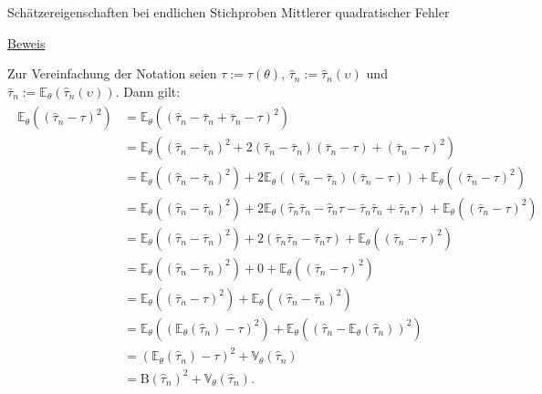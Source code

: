 \documentclass[
  8pt,
  ignorenonframetext,
]{beamer}
\newcommand{\ups} {\upsilon}
\begin{document}
\begin{frame}{\small Schätzereigenschaften bei endlichen Stichproben
\textbar{} Mittlerer quadratischer Fehler}
\protect\hypertarget{schuxe4tzereigenschaften-bei-endlichen-stichproben-mittlerer-quadratischer-fehler-2}{}
\footnotesize

\underline{Beweis}

Zur Vereinfachung der Notation seien \(\tau := \tau(\theta)\),
\(\hat{\tau}_n := \hat{\tau}_n(\ups)\) und
\(\bar{\tau}_n := \mathbb{E}_\theta(\hat{\tau}_n(\ups))\). Dann gilt:
\begin{align*}
\begin{split}
\mathbb{E}_\theta\left((\hat{\tau}_n - \tau)^2\right)
& = \mathbb{E}_\theta\left((\hat{\tau}_n - \bar{\tau}_n + \bar{\tau}_n - \tau)^2\right) \\
& = \mathbb{E}_\theta
\left(
(\hat{\tau}_n - \bar{\tau}_n)^2
+ 2(\hat{\tau}_n - \bar{\tau}_n)(\bar{\tau}_n - \tau)
+ (\bar{\tau}_n - \tau)^2
\right)
\\
& = \mathbb{E}_\theta\left((\hat{\tau}_n - \bar{\tau}_n)^2\right)
+ 2\mathbb{E}_\theta\left((\hat{\tau}_n - \bar{\tau}_n)(\bar{\tau}_n - \tau)\right)
+ \mathbb{E}_\theta\left((\bar{\tau}_n - \tau)^2\right) \\
& = \mathbb{E}_\theta\left((\hat{\tau}_n - \bar{\tau}_n)^2\right)
+ 2\mathbb{E}_\theta\left(
\hat{\tau}_n\bar{\tau}_n - \hat{\tau}_n\tau
- \bar{\tau}_n\bar{\tau}_n + \bar{\tau}_n\tau
\right)
+ \mathbb{E}_\theta\left((\bar{\tau}_n - \tau)^2\right)
\\
& =
\mathbb{E}_\theta\left((\hat{\tau}_n - \bar{\tau}_n)^2\right)
+ 2\left(
\bar{\tau}_n\bar{\tau}_n - \bar{\tau}_n\tau
\right)
+ \mathbb{E}_\theta\left((\bar{\tau}_n - \tau)^2\right) \\
& =
\mathbb{E}_\theta\left((\hat{\tau}_n - \bar{\tau}_n)^2\right)
+ 0
+ \mathbb{E}_\theta\left((\bar{\tau}_n - \tau)^2\right) \\
& =
\mathbb{E}_\theta\left((\bar{\tau}_n - \tau)^2\right)
+ \mathbb{E}_\theta\left((\hat{\tau}_n - \bar{\tau}_n)^2\right) \\
& =
\mathbb{E}_\theta\left((\mathbb{E}_\theta(\hat{\tau}_n) - \tau)^2\right)
+ \mathbb{E}_\theta\left((\hat{\tau}_n - \mathbb{E}_\theta(\hat{\tau}_n))^2\right) \\
& =
(\mathbb{E}_\theta(\hat{\tau}_n) - \tau)^2
+ \mathbb{V}_\theta(\hat{\tau}_n) \\
& =
\mbox{B}(\hat{\tau}_n)^2
+ \mathbb{V}_\theta(\hat{\tau}_n).
\end{split}
\end{align*}
\end{frame}
\end{document}
